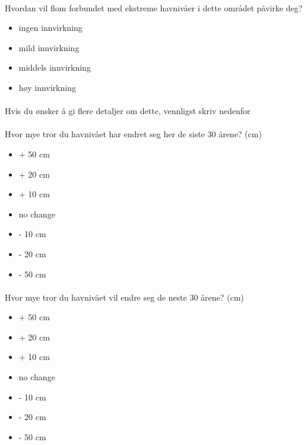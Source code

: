 \paragraph{}

Hvordan vil flom forbundet med ekstreme havnivåer i dette området påvirke deg?
\begin{itemize}
    \item ingen innvirkning
   \item mild innvirkning
   \item middels innvirkning
   \item høy innvirkning
\end{itemize}
\paragraph{}
Hvis du ønsker å gi flere detaljer om dette, vennligst skriv nedenfor
\paragraph{}

Hvor mye tror du havnivået har endret seg her de siste 30 årene?
(cm)
\begin{itemize}
    \item + 50 cm
    \item + 20 cm
    \item + 10 cm
    \item no change
    \item - 10 cm
    \item - 20 cm 
    \item - 50 cm 
\end{itemize}
\paragraph{}

Hvor mye tror du havnivået vil endre seg de neste 30 årene?
(cm)
\begin{itemize}
    \item + 50 cm
    \item + 20 cm
    \item + 10 cm
    \item no change
    \item - 10 cm
    \item - 20 cm 
    \item - 50 cm 
\end{itemize}
\paragraph{}

